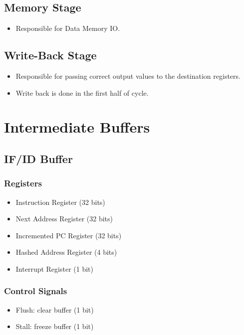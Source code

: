\subsection{Memory Stage}
\begin{itemize}
    \item Responsible for Data Memory IO.
\end{itemize}

\subsection{Write-Back Stage}
\begin{itemize}
    \item Responsible for passing correct output values to the destination registers.
    \item Write back is done in the first half of cycle.
\end{itemize}

\section{Intermediate Buffers}

\subsection{IF/ID Buffer}
\subsubsection{Registers}
\begin{itemize}
    \item Instruction Register (32 bits)
    \item Next Address Register (32 bits)
    \item Incremented PC Register (32 bits)
    \item Hashed Address Register (4 bits)
    \item Interrupt Register (1 bit)
\end{itemize}

\subsubsection{Control Signals}
\begin{itemize}
    \item Flush: clear buffer (1 bit)
    \item Stall: freeze buffer (1 bit)
\end{itemize}

